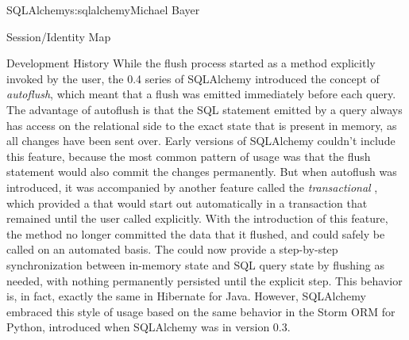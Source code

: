 \begin{aosachapter}{SQLAlchemy}{s:sqlalchemy}{Michael Bayer}
\begin{aosasect1}{Session/Identity Map}
\begin{aosasect2}{Development History}
While the flush process started as a method explicitly invoked by the
user, the 0.4 series of SQLAlchemy introduced the concept of \emph{autoflush},
which meant that a flush was emitted immediately before each query. The advantage
of autoflush is that the SQL statement emitted by a query always has
access on the relational side to the exact state that is present in memory,
as all changes have been sent over. Early versions of SQLAlchemy
couldn't include this feature, because the most common pattern of usage was
that the flush statement would also commit the changes permanently.
But when autoflush was introduced, it was accompanied by another feature
called the \emph{transactional} , which provided a
 that would start out automatically in a transaction that
remained until the user called  explicitly.
With the introduction of this feature, the  method no
longer committed the data that it flushed, and could safely
be called on an automated basis.   The  could now
provide a step-by-step
synchronization between in-memory state and SQL query state by flushing
as needed, with nothing
permanently persisted until the explicit  step. This behavior is, in fact,
exactly the same in Hibernate for Java.  However, SQLAlchemy embraced
this style of usage based on the same behavior in the Storm ORM for Python, introduced
when SQLAlchemy was in version 0.3.


\end{aosasect2}
\end{aosasect1}
\end{aosachapter}
